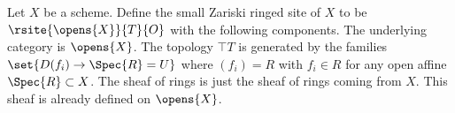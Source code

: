 \begin{definition}
Let $X$ be a scheme.
Define the small Zariski ringed site of $X$
to be $\rsite{\opens{X}}{T}{O}$ with the following components.
The underlying category is $\opens{X}$.
The topology $\top{T}$ is generated by the families $\set{D(f_i) \rightarrow \Spec{R}=U}$
where $(f_i) = R$ with $f_i\in R$ for any open affine $\Spec{R} \subset X$.
The sheaf of rings is just the sheaf of rings coming from $X$.
This sheaf is already defined on $\opens{X}$.
\end{definition}